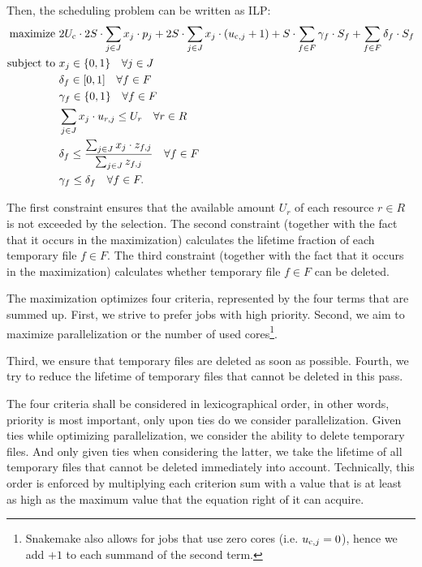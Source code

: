 \documentclass[parskip=half]{scrartcl}
\begin{document}
Then, the scheduling problem can be written as ILP:
\begin{align*}
	\text{maximize } & 2U_{\text{c}} \cdot 2S \cdot \sum_{j \in J} x_j \cdot p_j + 2S \cdot \sum_{j \in J} x_j \cdot (u_{\text{c},j} + 1) + S \cdot \sum_{f \in F} \gamma_f \cdot S_f + \sum_{f \in F} \delta_f \cdot S_f \\ \text{subject to } & x_j \in \{0,1\} \quad \forall j \in J\\ \quad & \delta_f \in [0,1] \quad  \forall f \in F\\ \quad & \gamma_f \in \{0,1\} \quad \forall f \in F\\ \quad & \sum_{j \in J} x_j \cdot u_{r,j} \leq U_r \quad \forall r \in R\\ \quad & \delta_f \leq \frac{\sum_{j \in J} x_j \cdot z_{f,j}}{\sum_{j \in J} z_{f,j}} \quad\forall f \in F\\ \quad & \gamma_f \leq \delta_f \quad\forall f \in F.
\end{align*}

The first constraint ensures that the available amount $U_r$ of each resource $r \in R$ is not exceeded by the selection.
The second constraint (together with the fact that it occurs in the maximization) calculates the lifetime fraction of each temporary file $f \in F$.
The third constraint (together with the fact that it occurs in the maximization) calculates whether temporary file $f \in F$ can be deleted.

The maximization optimizes four criteria, represented by the four terms that are summed up.
First, we strive to prefer jobs with high priority.
Second, we aim to maximize parallelization or the number of used cores\footnote{Snakemake also allows for jobs that use zero cores (i.e. $u_{\text{c},j} = 0$), hence we add $+1$ to each summand of the second term.}.

Third, we ensure that temporary files are deleted as soon as possible.
Fourth, we try to reduce the lifetime of temporary files that cannot be deleted in this pass.

The four criteria shall be considered in lexicographical order, in other words, priority is most important, only upon ties do we consider parallelization.
Given ties while optimizing parallelization, we consider the ability to delete temporary files.
And only given ties when considering the latter, we take the lifetime of all temporary files that cannot be deleted immediately into account.
Technically, this order is enforced by multiplying each criterion sum with a value that is at least as high as the maximum value that the equation right of it can acquire.
\end{document}

